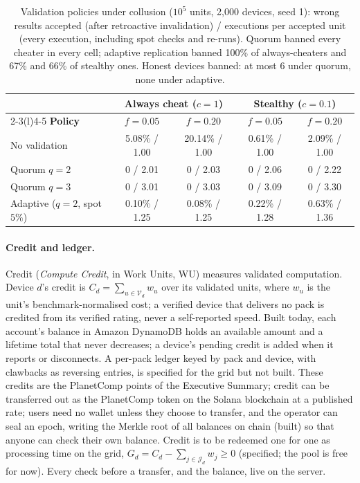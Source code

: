 \documentclass[11pt,a4paper]{article}
\theoremstyle{definition}
\theoremstyle{plain}
\begin{document}
\begin{table}[ht]
\centering
\caption{Validation policies under collusion ($10^5$ units, 2{,}000 devices, seed 1): wrong results accepted
(after retroactive invalidation) / executions per accepted unit (every execution, including spot checks and
re-runs). Quorum banned every cheater in every cell; adaptive replication banned 100\% of always-cheaters and
67\% and 66\% of stealthy ones. Honest devices banned: at most 6 under quorum, none under adaptive.}\label{tab:sim}
\small
\begin{tabular}{@{}lcccc@{}}
\toprule
 & \multicolumn{2}{c}{\textbf{Always cheat} ($c=1$)} & \multicolumn{2}{c}{\textbf{Stealthy} ($c=0.1$)} \\
\cmidrule(lr){2-3}\cmidrule(l){4-5}
\textbf{Policy} & $f=0.05$ & $f=0.20$ & $f=0.05$ & $f=0.20$ \\
\midrule
No validation & 5.08\% / 1.00 & 20.14\% / 1.00 & 0.61\% / 1.00 & 2.09\% / 1.00 \\
Quorum $q{=}2$ & 0 / 2.01 & 0 / 2.03 & 0 / 2.06 & 0 / 2.22 \\
Quorum $q{=}3$ & 0 / 3.01 & 0 / 3.03 & 0 / 3.09 & 0 / 3.30 \\
Adaptive ($q{=}2$, spot $5\%$) & 0.10\% / 1.25 & 0.08\% / 1.25 & 0.22\% / 1.28 & 0.63\% / 1.36 \\
\bottomrule
\end{tabular}
\end{table}

\paragraph{Credit and ledger.} Credit (\emph{Compute Credit}, in Work Units, WU) measures validated computation. Device $d$'s credit is $C_d=\sum_{u\in\mathcal{V}_d} w_u$ over its validated
units, where $w_u$ is the unit's benchmark-normalised cost; a verified device that delivers no pack is credited
from its verified rating, never a self-reported speed. Built today, each account's balance in Amazon DynamoDB holds an available amount and a lifetime total that never
decreases; a device's pending credit is added when it reports or disconnects. A per-pack ledger keyed by pack and device, with clawbacks as reversing entries, is
specified for the grid but not built. These credits are the PlanetComp points of the
Executive Summary; credit can be transferred out as the PlanetComp token on the Solana blockchain at
a published rate; users need no wallet unless they choose to transfer, and the operator can seal an epoch, writing the Merkle root of all
balances on chain (built) so that anyone can check their own balance. Credit is to be redeemed one for one as processing time on the grid,
$G_d=C_d-\sum_{j\in\mathcal{J}_d}w_j\ge0$ (specified; the pool is free for now). Every check before a transfer, and the balance, live on the server.
\end{document}
